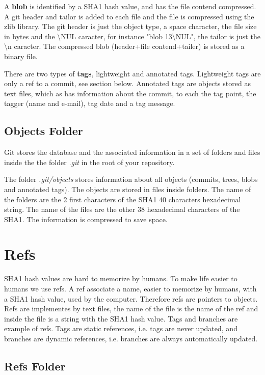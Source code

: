 \begin{refsection}
A \textbf{blob} is identified by a SHA1 hash value, and has the file contend compressed. A git header and tailor is added to each file and the file is compressed using the zlib library. The git header is just the object type, a space character, the file size in bytes and the \textbackslash NUL caracter, for instance "blob 13\textbackslash NUL", the tailor is just the \textbackslash n caracter. The compressed blob (header+file contend+tailer) is stored as a binary file.

There are two types of \textbf{tags}, lightweight and annotated tags. Lightweight tags are only a ref to a commit, see section below. Annotated tags are objects stored as text files, which as has information about the commit, to each the tag point, the tagger (name and e-mail), tag date and a tag message.

\subsection{Objects Folder}

Git stores the database and the associated information in a set of folders and files inside the the folder \emph{.git} in the root of your repository.

The folder \emph{.git/objects} stores information about all objects (commits, trees, blobs and annotated tags).
The objects are stored in files inside folders.
The name of the folders are the 2 first characters of the SHA1 40 characters hexadecimal string.
The name of the files are the other 38 hexadecimal characters of the SHA1.
The information is compressed to save space.

\section{Refs}

SHA1 hash values are hard to memorize by humans. To make life easier to humans we use refs. A ref associate a name, easier to memorize by humans, with a SHA1 hash value, used by the computer. Therefore refs are pointers to objects. Refs are implementes by text files, the name of the file is the name of the ref and inside the file is a string with the SHA1 hash value.
Tags and branches are example of refs. Tags are static references, i.e. tags are never updated, and branches are dynamic references, i.e. branches are always automatically updated.

\subsection{Refs Folder}


\end{refsection}
